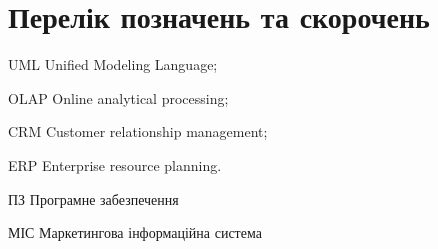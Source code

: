 \section*{Перелік позначень та скорочень}

\begin{abbrDescription}
\item[UML] Unified Modeling Language;
\item[OLAP] Online analytical processing;
\item[CRM] Customer relationship management;
\item[ERP] Enterprise resource planning.
\item[ПЗ] Програмне забезпечення
\item[МІС] Маркетингова інформаційна система
\end{abbrDescription}
